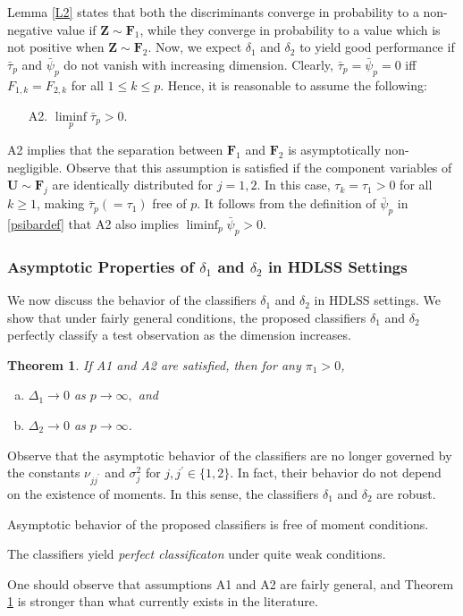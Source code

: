 \documentclass[twoside]{article}
\newcommand{\bZ}{\mathbf{Z}}
\newcommand{\bF}{\mathbf{F}}
\newcommand{\bU}{\mathbf{U}}
\newcommand{\0}{\mathbf{0}}
\newcommand{\1}{\mathbf{1}}
\numberwithin{equation}{section}
\newtheorem{thm}{Theorem}[section]
\begin{document}
Lemma \ref{L2} states that both the discriminants converge in probability to a non-negative value if $\bZ\sim\bF_1$, while they converge in probability to a value which is not positive when $\bZ\sim\bF_2$. Now, we expect $\delta_1$ and $\delta_2$ to yield good performance if $\bar{\tau}_p$ and $\bar{\psi}_p$ do not vanish with increasing dimension. Clearly, $\bar{\tau}_p=\bar{\psi}_p=0$ iff $F_{1,k}=F_{2,k}$ for all $1\le k\le p$. Hence, it is reasonable to assume the following:
\begin{enumerate}
 \item[A2.] $\liminf\limits_{p} \bar{\tau}_p>0$.
\end{enumerate}
A2 implies that the separation between $\bF_1$ and $\bF_2$ is asymptotically non-negligible. Observe that this assumption is satisfied if the component variables of $\bU\sim\bF_j$ are identically distributed for $j=1,2$. In this case, $\tau_{k}=\tau_1>0$ for all $k\ge 1$, making $\bar{\tau}_p(=\tau_1)$ free of $p$. It follows from the definition of $\bar{\psi}_p$ in \eqref{psibardef} that A2 also implies $\liminf_p\bar{\psi}_p>0$.

\subsubsection{Asymptotic Properties of $\delta_1$ and $\delta_2$ in HDLSS Settings}\label{asym.HDLSS.d1d2}

We now discuss the behavior of the classifiers $\delta_1$ and $\delta_2$ in HDLSS settings. We show that under fairly general conditions, the proposed classifiers $\delta_1$ and $\delta_2$ perfectly classify a test observation as the dimension increases.
\begin{thm}\label{d1thm}
 If {\rm A1} and {\rm A2} are satisfied, then for any $\pi_1>0$,
 \begin{enumerate}[(a)]
  \item $\Delta_1\to 0$ as $p\to\infty ,$ and
  \item $\Delta_2\to 0$ as $p\to\infty $.
 \end{enumerate}
\end{thm}
Observe that the asymptotic behavior of the classifiers are no longer governed  by the constants $\nu_{jj^\prime}$ and $\sigma^2_j$ for $j,j^\prime\in\{1,2\}$. In fact, their behavior do not depend on the existence of moments. In this sense, the classifiers $\delta_1$ and $\delta_2$ are robust.
\begin{tcolorbox}[colback=white]
Asymptotic behavior of the proposed classifiers is free of moment conditions.\newline

The classifiers yield {\it perfect classificaton} under quite weak conditions.%
\end{tcolorbox}
One should observe that assumptions A1 and A2 are fairly general, and Theorem \ref{d1thm} is stronger than what currently exists in the literature.
\end{document}
